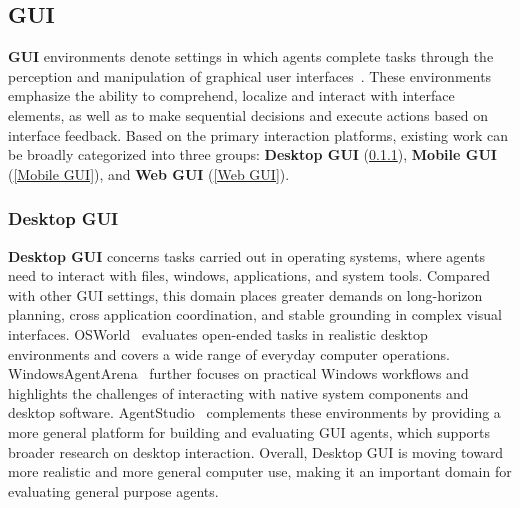 \subsection{GUI}
\label{GUI}
\textbf{GUI} environments denote settings in which agents complete tasks through the perception and manipulation of graphical user interfaces~\cite{OSWorld,WindowsAgentArena,AgentStudio,AitW,Mobile-Env,AndroidWorld,MobileAgentBench,WebShop,Mind2Web,WebArena,VisualWebArena}. These environments emphasize the ability to comprehend, localize and interact with interface elements, as well as to make sequential decisions and execute actions based on interface feedback. Based on the primary interaction platforms, existing work can be broadly categorized into three groups: \textbf{Desktop GUI} (\cref{Desktop GUI}), \textbf{Mobile GUI} (\cref{Mobile GUI}), and \textbf{Web GUI} (\cref{Web GUI}).

\subsubsection{Desktop GUI}
\label{Desktop GUI}
\textbf{Desktop GUI} concerns tasks carried out in operating systems, where agents need to interact with files, windows, applications, and system tools. Compared with other GUI settings, this domain places greater demands on long-horizon planning, cross application coordination, and stable grounding in complex visual interfaces. OSWorld~\cite{OSWorld} evaluates open-ended tasks in realistic desktop environments and covers a wide range of everyday computer operations. WindowsAgentArena~\cite{WindowsAgentArena} further focuses on practical Windows workflows and highlights the challenges of interacting with native system components and desktop software. AgentStudio~\cite{AgentStudio} complements these environments by providing a more general platform for building and evaluating GUI agents, which supports broader research on desktop interaction. Overall, Desktop GUI is moving toward more realistic and more general computer use, making it an important domain for evaluating general purpose agents.

